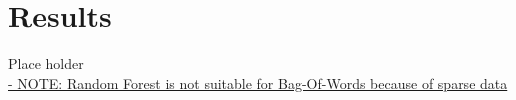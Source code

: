 \section{Results}
	{\color{red} \Large Place holder} \\
	\hyperref{http://fastml.com/classifying-text-with-bag-of-words-a-tutorial/}{category}{name}{
		- NOTE: Random Forest is not suitable for Bag-Of-Words because of sparse data
	}
	